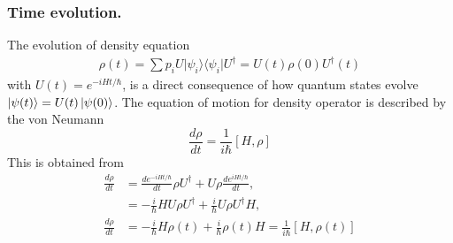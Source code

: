 \documentclass[../../../main.tex]{subfiles}
\begin{document}
\subsubsection{Time evolution.}
The evolution of density equation
\begin{align*}
    \rho(t) =
    \sum p_{i}U \lvert \psi_{i}\rangle\langle \psi_{i}\rvert U^{\dagger}   = U(t)\rho(0)U^\dagger(t)
\end{align*}
with $U(t)      = e^{-iHt/\hbar}$, is a direct consequence of how quantum states evolve $\ket{\psi(t)} = U(t) \ket{\psi(0)}$.
The equation of motion for density operator is described by the von Neumann
\begin{equation*}
    \frac{d\rho}{dt} = \frac{1 }{i\hbar }[H,\rho]
\end{equation*}
This is obtained from
\begin{align*}
    \frac{d\rho}{dt} & = \frac{d e^{-iHt/\hbar}}{dt}\rho U^\dagger + U\rho\frac{de^{iHt/\hbar}}{dt},       \\
                     & = -\frac{i}{\hbar}HU\rho U^\dagger + \frac{i}{\hbar}U\rho U^\dagger H,              \\
    \frac{d\rho}{dt} & = -\frac{i}{\hbar}H\rho(t) + \frac{i}{\hbar}\rho(t) H = \frac{1}{i\hbar}[H,\rho(t)]
\end{align*}
\end{document}
